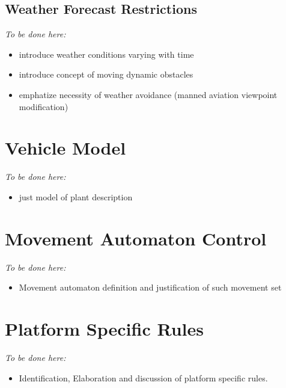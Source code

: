 \subsection{Weather Forecast Restrictions}\label{s:WeatherForecastRestrictions}
    \emph{To be done here:}
    \begin{itemize}
        \item introduce weather conditions varying with time 
        \item introduce concept of moving dynamic obstacles 
        \item emphatize necessity of weather avoidance (manned aviation viewpoint modification)
    \end{itemize}
    
\section{Vehicle Model}
    \emph{To be done here:}
    \begin{itemize}
        \item just model of plant description
    \end{itemize}
    
\section{Movement Automaton Control}
    \emph{To be done here:}
    \begin{itemize}
        \item  Movement automaton definition and justification of such movement set
    \end{itemize}

\section{Platform Specific Rules}
    \emph{To be done here:}
    \begin{itemize}
        \item Identification, Elaboration and discussion of platform specific rules.
    \end{itemize}